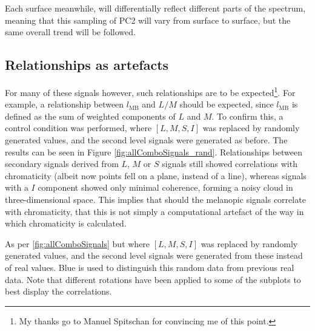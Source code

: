 
Each surface meanwhile, will differentially reflect different parts of the spectrum, meaning that this sampling of \gls{PC2} will vary from surface to surface, but the same overall trend will be followed.


\subsection{Relationships as artefacts}

For many of these signals however, such relationships are to be expected\footnote{My thanks go to Manuel Spitschan for convincing me of this point.}. For example, a relationship between $l_{\text{MB}}$ and $L/M$ should be expected, since $l_{\text{MB}}$ is defined as the sum of weighted components of $L$ and $M$. To confirm this, a control condition was performed, where $[L,M,S,I]$ was replaced by randomly generated values, and the second level signals were generated as before. The results can be seen in Figure \ref{fig:allComboSignals_rand}. Relationships between secondary signals derived from $L$, $M$ or $S$ signals still showed correlations with chromaticity (albeit now points fell on a plane, instead of a line), whereas signals with a $I$ component showed only minimal coherence, forming a noisy cloud in three-dimensional space. This implies that should the melanopic signals correlate with chromaticity, that this is not simply a computational artefact of the way in which chromaticity is calculated.

\begin{fullpagefigure}
\figpageside{}
\caption{As per \ref{fig:allComboSignals} but where $[L,M,S,I]$ was replaced by randomly generated values, and the second level signals were generated from these instead of real values. Blue is used to distinguish this random data from previous real data. Note that different rotations have been applied to some of the subplots to best display the correlations.}
\label{fig:allComboSignals_rand}
\end{fullpagefigure}

